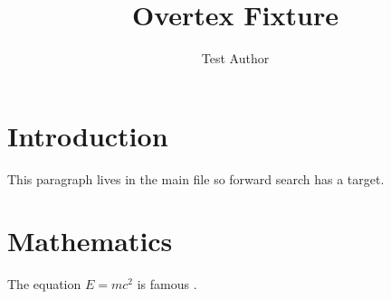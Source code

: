 \documentclass{article}
\title{Overtex Fixture}
\author{Test Author}
\begin{document}
\maketitle

\section{Introduction}
This paragraph lives in the main file so forward search has a target.



\section{Mathematics}
The equation $E = mc^2$ is famous \cite{einstein1905}.



\end{document}
